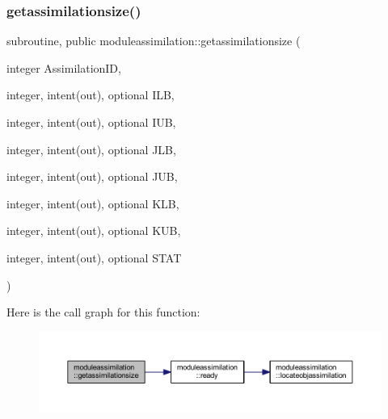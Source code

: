 \subsubsection{\texorpdfstring{getassimilationsize()}{getassimilationsize()}}
{\footnotesize\ttfamily subroutine, public moduleassimilation\+::getassimilationsize (\begin{DoxyParamCaption}\item[{integer}]{Assimilation\+ID,  }\item[{integer, intent(out), optional}]{I\+LB,  }\item[{integer, intent(out), optional}]{I\+UB,  }\item[{integer, intent(out), optional}]{J\+LB,  }\item[{integer, intent(out), optional}]{J\+UB,  }\item[{integer, intent(out), optional}]{K\+LB,  }\item[{integer, intent(out), optional}]{K\+UB,  }\item[{integer, intent(out), optional}]{S\+T\+AT }\end{DoxyParamCaption})}

Here is the call graph for this function\+:\nopagebreak
\begin{figure}[H]
\begin{center}
\leavevmode
\includegraphics[width=350pt]{namespacemoduleassimilation_a9dcf23578dc00d565791f0b2ce1edc7d_cgraph}
\end{center}
\end{figure}
\mbox{\label{namespacemoduleassimilation_a3f99df6f8207db00fe69fa4d172335b1}} 
